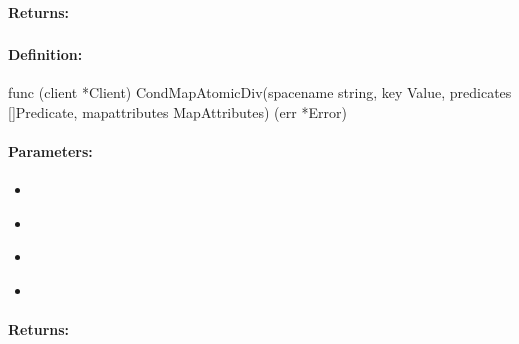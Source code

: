 \paragraph{Returns:}


\pagebreak
\subsubsection{}
\label{api:Go:CondMapAtomicDiv}


\paragraph{Definition:}
\begin{gocode}
func (client *Client) CondMapAtomicDiv(spacename string, key Value, predicates []Predicate, mapattributes MapAttributes) (err *Error)
\end{gocode}

\paragraph{Parameters:}
\begin{itemize}[noitemsep]
\item {}\\

\item {}\\

\item {}\\

\item {}\\

\end{itemize}

\paragraph{Returns:}


\pagebreak
\subsubsection{}
\label{api:Go:GroupMapAtomicDiv}


